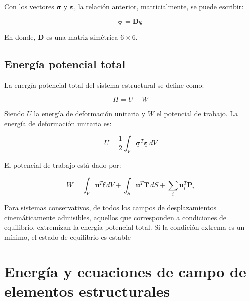 Con los vectores $\bm{\sigma}$ y $\bm{\varepsilon}$, la relación anterior, matricialmente, se puede escribir:

\begin{equation}
	\underline{\bm{\sigma}} = \mathbf{D} \underline{\bm{\varepsilon}}
\end{equation}

En donde, $\mathbf{D}$ es una matriz simétrica $6 \times 6$.


\subsection{Energía potencial total}

La energía potencial total del sistema estructural se define como:

\begin{equation}
	\Pi = U - W
	\label{eq:EP}
\end{equation}

Siendo $U$ la energía de deformación unitaria y $W$ el potencial de trabajo. La energía de deformación unitaria es:

\begin{equation}
	U = \dfrac{1}{2} \int_V \underline{\bm{\sigma}}^T \underline{\bm{\varepsilon}} \, dV
\end{equation}

El potencial de trabajo está dado por:

\begin{equation}
	W = \int_V \mathbf{u}^T \mathbf{f} \, dV + \int_S \mathbf{u}^T \mathbf{T} \, dS + \sum_i \mathbf{u}^T_i \mathbf{P}_i
\end{equation}



\begin{kaobox}[frametitle=Principio de mínima energía potencial]
	Para sistemas conservativos, de todos los campos de desplazamientos cinemáticamente admisibles, aquellos que corresponden a condiciones de equilibrio, extremizan la energía potencial total. Si la condición extrema es un mínimo, el estado de equilibrio es estable
\end{kaobox}

\section{Energía y ecuaciones de campo de elementos estructurales}

